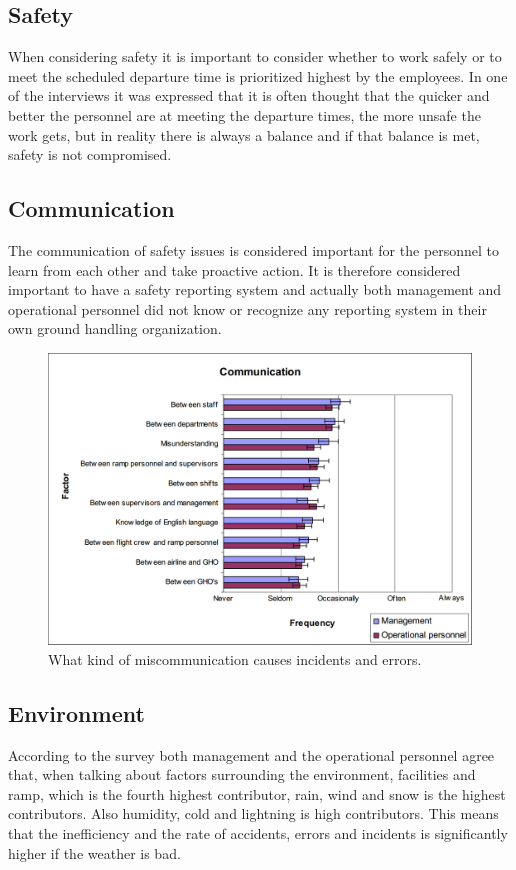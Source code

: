 \subsection{Safety}
When considering safety it is important to consider whether to work safely or to meet the scheduled departure time is prioritized highest by the employees. In one of the interviews it was expressed that it is often thought that the quicker and better the personnel are at meeting the departure times, the more unsafe the work gets, but in reality there is always a balance and if that balance is met, safety is not compromised.

\subsection{Communication}
The communication of safety issues is considered important for the personnel to learn from each other and take proactive action. It is therefore considered important to have a safety reporting system and actually both management and operational personnel did not know or recognize any reporting system in their own ground handling organization.

\begin{figure}[H]
\centering
\includegraphics[width=\textwidth]{Grafik/CommunicationalFactors}
\caption{What kind of miscommunication causes incidents and errors.}
\label{CommunicationalFactors}
\end{figure}

\subsection{Environment}
According to the survey both management and the operational personnel agree that, when talking about factors surrounding the environment, facilities and ramp, which is the fourth highest contributor, rain, wind and snow is the highest contributors. Also humidity, cold and lightning is high contributors. This means that the inefficiency and the rate of accidents, errors and incidents is significantly higher if the weather is bad.

